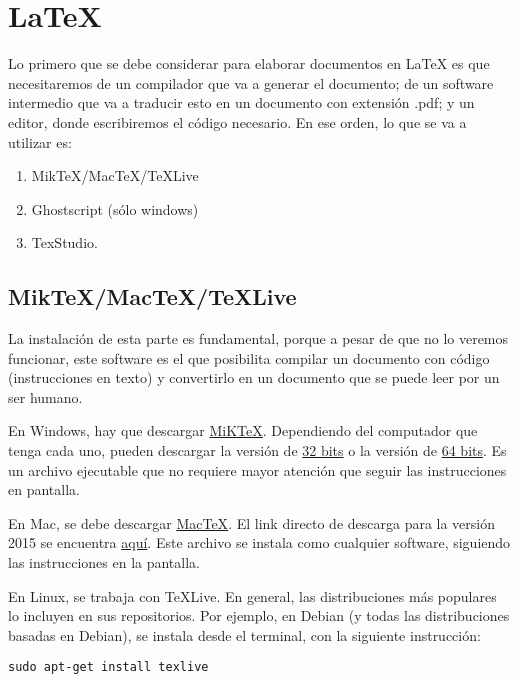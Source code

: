 \documentclass[letterpaper,12pt]{article}
\begin{document}
\section*{\LaTeX{}}

Lo primero que se debe considerar para elaborar documentos en \LaTeX{} es que necesitaremos de un compilador que va a generar el documento; de un software intermedio que va a traducir esto en un documento con extensión .pdf; y un editor, donde escribiremos el código necesario. En ese orden, lo que se va a utilizar es:

\begin{enumerate}
\item MikTeX/MacTeX/TeXLive
\item Ghostscript (sólo windows)
\item TexStudio.
\end{enumerate}

\subsection*{MikTeX/MacTeX/TeXLive}
La instalación de esta parte es fundamental, porque a pesar de que no lo veremos funcionar, este software es el que posibilita compilar un documento con código (instrucciones en texto) y convertirlo en un documento que se puede leer por un ser humano. 

En Windows, hay que descargar \href{http://miktex.org/}{MiKTeX}. Dependiendo del computador que tenga cada uno, pueden descargar la versión de \href{https://miktex.org/download#all}{32 bits} o la versión de \href{https://miktex.org/download#all}{64 bits}. Es un archivo ejecutable que no requiere mayor atención que seguir las instrucciones en pantalla.

En Mac, se debe descargar \href{https://tug.org/mactex/}{MacTeX}. El link directo de descarga para la versión 2015 se encuentra \href{https://tug.org/mactex/mactex-download.html}{aquí}. Este archivo se instala como cualquier software, siguiendo las instrucciones en la pantalla.

En Linux, se trabaja con TeXLive. En general, las distribuciones más populares lo incluyen en sus repositorios. Por ejemplo, en Debian (y todas las distribuciones basadas en Debian), se instala desde el terminal, con la siguiente instrucción:

\begin{verbatim}
sudo apt-get install texlive
\end{verbatim}
\end{document}
